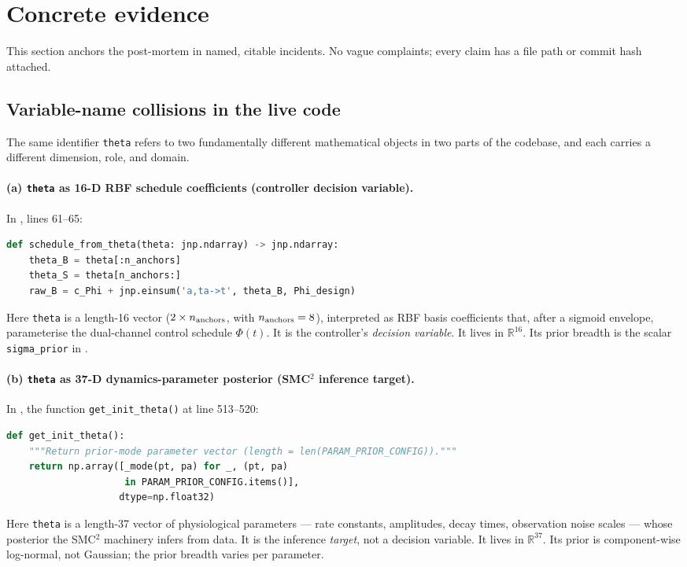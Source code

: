 \documentclass[11pt,a4paper]{article}
\begin{document}
\section{Concrete evidence}
\label{sec:evidence}

This section anchors the post-mortem in named, citable incidents.
No vague complaints; every claim has a file path or commit hash
attached.

\subsection{Variable-name collisions in the live code}
\label{sec:evidence-collisions}

The same identifier \texttt{theta} refers to two fundamentally
different mathematical objects in two parts of the codebase, and
each carries a different dimension, role, and domain.

\paragraph{(a) \texttt{theta} as 16-D RBF schedule coefficients
(controller decision variable).} In
, lines 61--65:
\begin{lstlisting}[language=Python]
def schedule_from_theta(theta: jnp.ndarray) -> jnp.ndarray:
    theta_B = theta[:n_anchors]
    theta_S = theta[n_anchors:]
    raw_B = c_Phi + jnp.einsum('a,ta->t', theta_B, Phi_design)
\end{lstlisting}
Here \texttt{theta} is a length-16 vector ($2 \times n_{\rm anchors}$,
with $n_{\rm anchors} = 8$), interpreted as RBF basis coefficients
that, after a sigmoid envelope, parameterise the dual-channel
control schedule $\Phi(t)$. It is the controller's
\emph{decision variable}. It lives in $\mathbb{R}^{16}$. Its prior
breadth is the scalar \texttt{sigma\_prior} in
.

\paragraph{(b) \texttt{theta} as 37-D dynamics-parameter posterior
(SMC$^2$ inference target).} In
, the function
\verb|get_init_theta()| at line 513--520:
\begin{lstlisting}[language=Python]
def get_init_theta():
    """Return prior-mode parameter vector (length = len(PARAM_PRIOR_CONFIG))."""
    return np.array([_mode(pt, pa) for _, (pt, pa)
                     in PARAM_PRIOR_CONFIG.items()],
                    dtype=np.float32)
\end{lstlisting}
Here \texttt{theta} is a length-37 vector of physiological
parameters --- rate constants, amplitudes, decay times, observation
noise scales --- whose posterior the SMC$^2$ machinery infers from
data. It is the inference \emph{target}, not a decision variable.
It lives in $\mathbb{R}^{37}$. Its prior is component-wise
log-normal, not Gaussian; the prior breadth varies per parameter.
\end{document}
